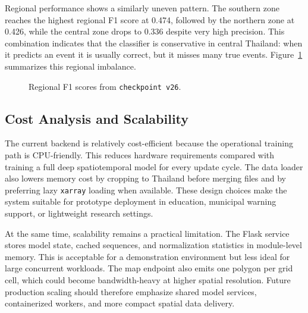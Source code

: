 \documentclass[12pt,a4paper]{article}
\begin{document}
Regional performance shows a similarly uneven pattern. The southern zone reaches the highest regional F1 score at 0.474, followed by the northern zone at 0.426, while the central zone drops to 0.336 despite very high precision. This combination indicates that the classifier is conservative in central Thailand: when it predicts an event it is usually correct, but it misses many true events. Figure~\ref{fig:regional-f1} summarizes this regional imbalance.

\begin{figure}[H]
\centering
{}
\caption{Regional F1 scores from \texttt{checkpoint v26}.}
\label{fig:regional-f1}
\end{figure}

\subsection{Cost Analysis and Scalability}
The current backend is relatively cost-efficient because the operational training path is CPU-friendly. This reduces hardware requirements compared with training a full deep spatiotemporal model for every update cycle. The data loader also lowers memory cost by cropping to Thailand before merging files and by preferring lazy \texttt{xarray} loading when available. These design choices make the system suitable for prototype deployment in education, municipal warning support, or lightweight research settings.

At the same time, scalability remains a practical limitation. The Flask service stores model state, cached sequences, and normalization statistics in module-level memory. This is acceptable for a demonstration environment but less ideal for large concurrent workloads. The map endpoint also emits one polygon per grid cell, which could become bandwidth-heavy at higher spatial resolution. Future production scaling should therefore emphasize shared model services, containerized workers, and more compact spatial data delivery.
\end{document}
